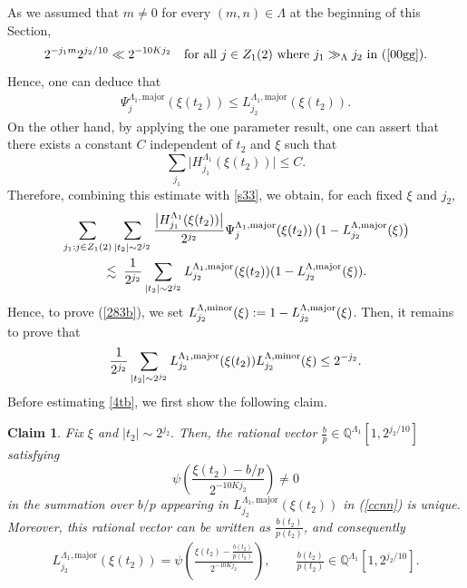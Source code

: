 \documentclass[11 pt,letterpaper]{amsart}
\theoremstyle{plain}
\newtheorem{claim}{Claim}\numberwithin{claim}{section}
\theoremstyle{definition}
\theoremstyle{remark} \theoremstyle{exam} \theoremstyle{ob}
\numberwithin{equation}{section}
\begin{document}
 As we assumed that $m \ne 0$ for every $(m,n)\in \Lambda$ at the beginning of this Section, 
\[
2^{-j_1 m} 2^{j_2/10} \ll 2^{-10 K j_2}
\quad \text{for all}\  j \in Z_1(2)\ \text{where}\ j_1\gg_{\Lambda} j_2\ \text{in (\ref{00gg})}.
\]
Hence, one can deduce that
\begin{align}\label{s33}
\Psi_j^{\Lambda_1,\mathrm{major}}(\xi(t_2))
  \le
  L^{\Lambda_1,\mathrm{major}}_{j_2}(\xi(t_2)).
\end{align}
  On the other hand, by applying the one parameter result, one can assert that there exists a constant $C$   independent of $t_2$ and $\xi$ such that
\[
\sum_{j_1} \bigl|H^{\Lambda_1}_{j_1}(\xi(t_2))\bigr| \le C.
\]
Therefore, combining this estimate with \eqref{s33}, we obtain, for each fixed
$\xi$ and $j_2$,  
\begin{align*} 
&\sum_{j_1 : j \in Z_1(2)} 
  \sum_{|t_2|\sim 2^{j_2}}
  \frac{\bigl|H^{\Lambda_1}_{j_1}(\xi(t_2))\bigr|}{2^{j_2}}
  \Psi_j^{\Lambda_1,\mathrm{major}}\!\left(\xi(t_2)\right)
  \bigl(1 - L^{\Lambda,\mathrm{major}}_{j_2}(\xi)\bigr) \nonumber\\
&\qquad\quad  \;\lesssim\; 
  \frac{1}{2^{j_2}}\sum_{|t_2|\sim 2^{j_2}}
   L^{\Lambda_1,\mathrm{major}}_{j_2}(\xi(t_2))
(1-L^{\Lambda,\rm{major}}_{j_2}(\xi)). 
\end{align*}
Hence,  to prove  (\ref{283b}), we set $L^{\Lambda,\rm{minor}}_{j_2}(\xi):=1-L^{\Lambda,\rm{major}}_{j_2}(\xi)$.  Then, it remains to prove that
\begin{align} 
  \frac{1}{2^{j_2}}\sum_{|t_2|\sim 2^{j_2}}
   L^{\Lambda_1,\mathrm{major}}_{j_2}(\xi(t_2))
L^{\Lambda,\rm{minor}}_{j_2}(\xi)\le 2^{-j_2}.\label{4tb}
\end{align}
Before estimating \eqref{4tb}, we first show the following claim.
\begin{claim}\label{cl31}
Fix $\xi$ and  $|t_2|\sim 2^{j_2}.$  Then, the rational vector $\frac{b}{p} \in \mathbb{Q}^{\Lambda_1}[1,2^{j_2/10}]$
satisfying
\[
\psi\!\left(\frac{\xi(t_2)-b/p}{2^{-10K j_2}}\right) \neq 0
\]
in the summation over $b/p$  appearing in $L^{\Lambda_1,\mathrm{major}}_{j_2}(\xi(t_2))$ in (\ref{ccnn})  is unique.  
Moreover, this rational  vector can be written as $\frac{b(t_2)}{p(t_2)}$, and consequently
\begin{align}\label{i44}
L^{\Lambda_1,\mathrm{major}}_{j_2}(\xi(t_2))
  = 
  \psi\!\left(
    \frac{\xi(t_2)-\frac{b(t_2)}{p(t_2)}}{2^{-10K j_2}}
  \right),
  \qquad 
  \frac{b(t_2)}{p(t_2)} \in \mathbb{Q}^{\Lambda_1}[1,2^{j_2/10}].
\end{align}
\end{claim}
 
\end{document}
